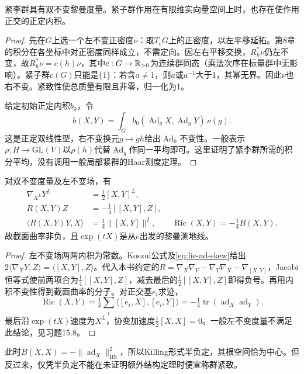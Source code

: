 \begin{theorem}\label{thm:lie-compact-average}
紧李群具有双不变黎曼度量。紧子群作用在有限维实向量空间上时，也存在使作用正交的正定内积。
\end{theorem}
\begin{proof}
先在$G$上选一个左不变正密度$\nu$：取$T_eG$上的正密度，以左平移延拓。第8章的积分在各坐标中对正密度同样成立，不需定向。因左右平移交换，$R_h^*\nu$仍左不变，故$R_h^*\nu=c(h)\nu$，其中$c:G\to\mathbb{R}_{>0}$为连续群同态（乘法次序在标量群中无影响）。紧子群$c(G)$只能是$\{1\}$：若含$a\ne1$，则$a$或$a^{-1}$大于1，其幂无界。因此$\nu$也右不变。紧致性使总质量有限且非零，归一化为1。

给定初始正定内积$b_0$，令
\[
 b(X,Y)=\int_G b_0(\operatorname{Ad}_gX,\operatorname{Ad}_gY)\,\nu(g).
\]
这是正定双线性型，右不变换元$g\mapsto gh$给出$\operatorname{Ad}_h$不变性。一般表示$\rho:H\to\mathrm{GL}(V)$以$\rho(h)$代替$\operatorname{Ad}_g$作同一平均即可。这里证明了紧李群所需的积分平均，没有调用一般局部紧群的Haar测度定理。
\end{proof}

\begin{theorem}\label{thm:lie-biinvariant-curvature}
对双不变度量及左不变场，有
\begin{align*}
 \nabla_{X^L}Y^L&=\tfrac12[X,Y]^L,\\
 R(X,Y)Z&=-\tfrac14[[X,Y],Z],\\
 \langle R(X,Y)Y,X\rangle&=\tfrac14\|[X,Y]\|^2,\qquad
 \operatorname{Ric}(X,Y)=-\tfrac14B(X,Y).
\end{align*}
故截面曲率非负，且$\exp(tX)$是从$e$出发的黎曼测地线。
\end{theorem}
\begin{proof}
左不变场两两内积为常数。Koszul公式及\eqref{eq:lie-ad-skew}给出$2\langle\nabla_XY,Z\rangle=\langle[X,Y],Z\rangle$。代入本书约定的$R=\nabla_X\nabla_Y-\nabla_Y\nabla_X-\nabla_{[X,Y]}$，Jacobi恒等式使前两项合为$\tfrac14[[X,Y],Z]$，减去最后的$\tfrac12[[X,Y],Z]$即得负号。再用内积不变性得到截面曲率的分子。对正交基$e_i$求迹，
\[
 \operatorname{Ric}(X,Y)=\tfrac14\sum_i\langle[e_i,X],[e_i,Y]\rangle
 =-\tfrac14\operatorname{tr}(\operatorname{ad}_X\operatorname{ad}_Y).
\]
最后沿$\exp(tX)$速度为$X^L$，协变加速度$\frac12[X,X]=0$。一般左不变度量不满足此结论，见习题15.8。
\end{proof}
此时$B(X,X)=-\|\operatorname{ad}_X\|_{\mathrm{HS}}^2$，所以Killing形式半负定，其根空间恰为中心。但反过来，仅凭半负定不能在未证明额外结构定理时便宣称群紧致。

